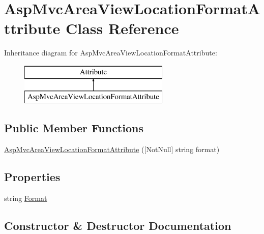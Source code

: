 \hypertarget{class_asp_mvc_area_view_location_format_attribute}{}\section{Asp\+Mvc\+Area\+View\+Location\+Format\+Attribute Class Reference}
\label{class_asp_mvc_area_view_location_format_attribute}
Inheritance diagram for Asp\+Mvc\+Area\+View\+Location\+Format\+Attribute\+:\begin{figure}[H]
\begin{center}
\leavevmode
\includegraphics[height=2.000000cm]{class_asp_mvc_area_view_location_format_attribute}
\end{center}
\end{figure}
\subsection*{Public Member Functions}
\begin{DoxyCompactItemize}
\item 
\mbox{\hyperlink{class_asp_mvc_area_view_location_format_attribute_a5a3a2668fd0bce0c85462a14cb54f3cf}{Asp\+Mvc\+Area\+View\+Location\+Format\+Attribute}} (\mbox{[}Not\+Null\mbox{]} string format)
\end{DoxyCompactItemize}
\subsection*{Properties}
\begin{DoxyCompactItemize}
\item 
string \mbox{\hyperlink{class_asp_mvc_area_view_location_format_attribute_ac3d03e8d1371c427048f84046c327e0e}{Format}}
\end{DoxyCompactItemize}


\subsection{Constructor \& Destructor Documentation}
\mbox{\label{class_asp_mvc_area_view_location_format_attribute_a5a3a2668fd0bce0c85462a14cb54f3cf}} 

